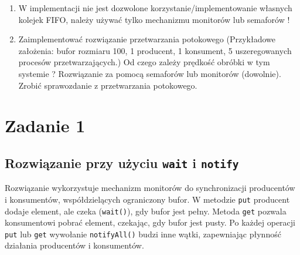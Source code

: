 \documentclass[11pt]{article}
\begin{document}
\begin{enumerate}
\item W implementacji nie jest dozwolone korzystanie/implementowanie własnych
kolejek FIFO, należy używać tylko mechanizmu monitorów lub semaforów !
\item Zaimplementować rozwiązanie przetwarzania potokowego (Przykładowe założenia:
bufor rozmiaru 100, 1 producent, 1 konsument, 5 uszeregowanych procesów
przetwarzających.) Od czego zależy prędkość obróbki w tym systemie ?
Rozwiązanie za pomocą semaforów lub monitorów (dowolnie). Zrobić sprawozdanie
z przetwarzania potokowego.
\end{enumerate}
\section*{Zadanie 1}
\label{sec:org3463791}
\subsection*{Rozwiązanie przy użyciu \texttt{wait} i \texttt{notify}}
\label{sec:orgd6cce55}
Rozwiązanie wykorzystuje mechanizm monitorów do synchronizacji producentów i
konsumentów, współdzielących ograniczony bufor. W metodzie \texttt{put} producent dodaje
element, ale czeka (\texttt{wait()}), gdy bufor jest pełny. Metoda \texttt{get} pozwala
konsumentowi pobrać element, czekając, gdy bufor jest pusty. Po każdej operacji
\texttt{put} lub \texttt{get} wywołanie \texttt{notifyAll()} budzi inne wątki, zapewniając płynność
działania producentów i konsumentów.
\end{document}
